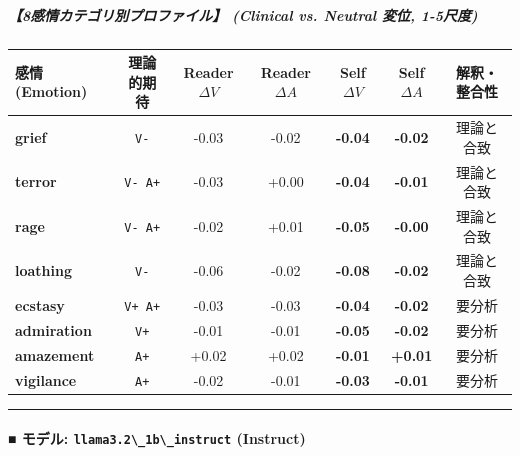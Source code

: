 \subparagraph{【8感情カテゴリ別プロファイル】 (Clinical vs. Neutral 変位, 1-5尺度)}
\begin{center}
\small
\begin{tabular}{lcccccc}
\toprule
\textbf{感情 (Emotion)} & \textbf{理論的期待} & \textbf{Reader $\Delta V$} & \textbf{Reader $\Delta A$} & \textbf{Self $\Delta V$} & \textbf{Self $\Delta A$} & \textbf{解釈・整合性} \\
\midrule
\textbf{grief} & \texttt{V-} & -0.03 & -0.02 & \textbf{-0.04} & \textbf{-0.02} & 理論と合致 \\
\textbf{terror} & \texttt{V- A+} & -0.03 & +0.00 & \textbf{-0.04} & \textbf{-0.01} & 理論と合致 \\
\textbf{rage} & \texttt{V- A+} & -0.02 & +0.01 & \textbf{-0.05} & \textbf{-0.00} & 理論と合致 \\
\textbf{loathing} & \texttt{V-} & -0.06 & -0.02 & \textbf{-0.08} & \textbf{-0.02} & 理論と合致 \\
\textbf{ecstasy} & \texttt{V+ A+} & -0.03 & -0.03 & \textbf{-0.04} & \textbf{-0.02} & 要分析 \\
\textbf{admiration} & \texttt{V+} & -0.01 & -0.01 & \textbf{-0.05} & \textbf{-0.02} & 要分析 \\
\textbf{amazement} & \texttt{A+} & +0.02 & +0.02 & \textbf{-0.01} & \textbf{+0.01} & 要分析 \\
\textbf{vigilance} & \texttt{A+} & -0.02 & -0.01 & \textbf{-0.03} & \textbf{-0.01} & 要分析 \\
\bottomrule
\end{tabular}
\end{center}


\vspace{0.5em}\hrule\vspace{0.5em}

\paragraph{■ モデル: \texttt{llama3.2\textbackslash{}\_1b\textbackslash{}\_instruct} (Instruct)}

